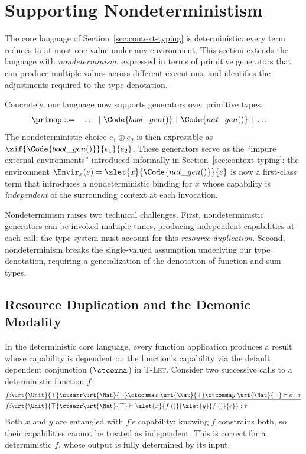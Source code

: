 \section{Supporting Nondeterministism}\label{sec:extension}

The core language of Section~\ref{sec:context-typing} is
deterministic: every term reduces to at most one value under any
environment.  This section extends the language with
\emph{nondeterminism}, expressed in terms of primitive generators that
can produce multiple values across different executions, and
identifies the adjustments required to the type denotation.

Concretely, our language now supports generators over primitive types:
\begin{align*}
  \primop ::= \quad & \ldots ~|~ \Code{bool\_gen()} ~|~
  \Code{nat\_gen()} ~|~ \ldots
\end{align*}
The nondeterministic choice $e_1 \oplus e_2$ is then expressible as
$\zif{\Code{bool\_gen()}}{e_1}{e_2}$.  These generators serve as the
``impure external environments'' introduced informally in
Section~\ref{sec:context-typing}: the environment $\Envir_x(e) \doteq
\zlet{x}{\Code{nat\_gen()}}{e}$ is now a first-class term that
introduces a nondeterministic binding for $x$ whose capability is
\emph{independent} of the surrounding context at each invocation.

Nondeterminism raises two technical challenges.  First, nondeterministic
generators can be invoked multiple times, producing independent
capabilities at each call; the type system must account for this
\emph{resource duplication}.  Second, nondeterminism breaks the
single-valued assumption underlying our type denotation, requiring a
generalization of the denotation of function and sum types.

\subsection{Resource Duplication and the Demonic Modality}\label{subsec:duplication}

In the deterministic core language, every function application produces
a result whose capability is dependent on the function's capability via
the default dependent conjunction ($\ctcomma$) in \textsc{T-Let}.  Consider two
successive calls to a deterministic function $f$:
\begin{align*}
  &\underline{f{:}\urt{\Unit}{\top} \ctsarr \urt{\Nat}{\top}
    \ctcomma x{:}\urt{\Nat}{\top} \ctcomma y{:}\urt{\Nat}{\top}
    \vdash e : \tau}
  \\&f{:}\urt{\Unit}{\top} \ctsarr \urt{\Nat}{\top} \vdash
    \zlet{x}{f\;()}{\zlet{y}{f\;()}{e}} : \tau
\end{align*}
Both $x$ and $y$ are entangled with $f$'s capability: knowing $f$
constrains both, so their capabilities cannot be treated as
independent.  This is correct for a deterministic $f$, whose output
is fully determined by its input.


